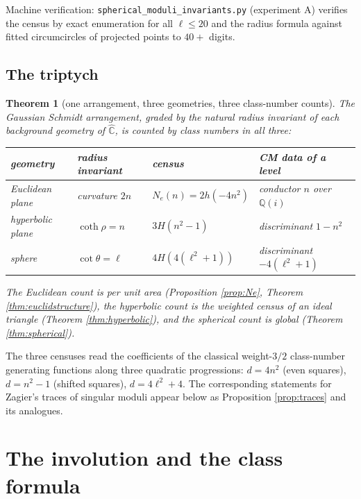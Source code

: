 \documentclass[11pt]{amsart}
\numberwithin{equation}{section}
\theoremstyle{plain}
\newtheorem{theorem}{Theorem}[section]
\theoremstyle{definition}
\theoremstyle{remark}
\newcommand{\C}{\mathbb{C}}
\newcommand{\Q}{\mathbb{Q}}
\newcommand{\Chat}{\widehat{\C}}
\begin{document}
Machine verification: \texttt{spherical\_moduli\_invariants.py}
(experiment A) verifies the census by exact enumeration for all
$\ell \le 20$ and the radius formula against fitted circumcircles of
projected points to $40+$ digits.

\subsection{The triptych}

\begin{theorem}[one arrangement, three geometries, three class-number
counts]\label{thm:triptych}
The Gaussian Schmidt arrangement, graded by the natural radius invariant
of each background geometry of $\Chat$, is counted by class numbers in
all three:
\begin{center}
\small
\begin{tabular}{@{}llll@{}}
\toprule
geometry & radius invariant & census & CM data of a level\\
\midrule
Euclidean plane & curvature $2n$ & $N_e(n) = 2h(-4n^2)$ &
conductor $n$ over $\Q(i)$\\
hyperbolic plane & $\coth\rho = n$ & $3H(n^2 - 1)$ &
discriminant $1 - n^2$\\
sphere & $\cot\theta = \ell$ & $4H(4(\ell^2 + 1))$ &
discriminant $-4(\ell^2 + 1)$\\
\bottomrule
\end{tabular}
\end{center}
The Euclidean count is per unit area (Proposition \ref{prop:Ne},
Theorem \ref{thm:euclidstructure}), the hyperbolic count is the weighted
census of an ideal triangle (Theorem \ref{thm:hyperbolic}), and the
spherical count is global (Theorem \ref{thm:spherical}).
\end{theorem}

The three censuses read the coefficients of the classical weight-$3/2$
class-number generating functions \cite{Cohen1975, Zagier1975} along
three quadratic progressions: $d = 4n^2$ (even squares), $d = n^2 - 1$
(shifted squares), $d = 4\ell^2 + 4$.  The corresponding statements for
Zagier's traces of singular moduli \cite{Zagier2002} appear below as
Proposition \ref{prop:traces} and its analogues.

\section{The involution and the class formula}\label{sec:involution}
\end{document}
